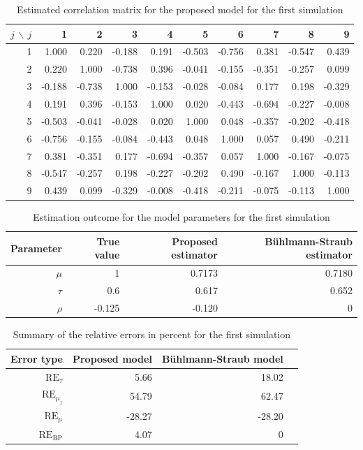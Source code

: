 \documentclass[11pt]{article}
\theoremstyle{definition}
\begin{document}
\begin{table}[H]
\label{tab:1_sim_corr}
\centering
\caption{Estimated correlation matrix for the proposed model for the first simulation}
\begin{tabular}{r|rrrrrrrrr}
  \hline
 $j\,\backslash\, j$ & 1 & 2 & 3 & 4 & 5 & 6 & 7 & 8 & 9 \\ 
  \hline
1 & 1.000 & 0.220 & -0.188 & 0.191 & -0.503 & -0.756 & 0.381 & -0.547 & 0.439 \\ 
  2 & 0.220 & 1.000 & -0.738 & 0.396 & -0.041 & -0.155 & -0.351 & -0.257 & 0.099 \\ 
  3 & -0.188 & -0.738 & 1.000 & -0.153 & -0.028 & -0.084 & 0.177 & 0.198 & -0.329 \\ 
  4 & 0.191 & 0.396 & -0.153 & 1.000 & 0.020 & -0.443 & -0.694 & -0.227 & -0.008 \\ 
  5 & -0.503 & -0.041 & -0.028 & 0.020 & 1.000 & 0.048 & -0.357 & -0.202 & -0.418 \\ 
  6 & -0.756 & -0.155 & -0.084 & -0.443 & 0.048 & 1.000 & 0.057 & 0.490 & -0.211 \\ 
  7 & 0.381 & -0.351 & 0.177 & -0.694 & -0.357 & 0.057 & 1.000 & -0.167 & -0.075 \\ 
  8 & -0.547 & -0.257 & 0.198 & -0.227 & -0.202 & 0.490 & -0.167 & 1.000 & -0.113 \\ 
  9 & 0.439 & 0.099 & -0.329 & -0.008 & -0.418 & -0.211 & -0.075 & -0.113 & 1.000 \\ 
   \hline
\end{tabular}
\end{table}

\begin{table}[H]
\label{tab:1_sim_single_params}
    \centering
        \caption{Estimation outcome for the model parameters for the first simulation}
    \begin{tabular}{rrrr}
    \hline
    Parameter & True value & Proposed estimator & Bühlmann-Straub estimator \\
    \hline
    $\mu$ & 1 & 0.7173 & 0.7180 \\
    $\tau$ & 0.6 & 0.617 & 0.652 \\
    $\rho$ & -0.125 & -0.120 & 0 \\    
    \hline
    \end{tabular}
\end{table}

\begin{table}[H]
\label{tab:1_sim_errors}
    \centering
        \caption{Summary of the relative errors in percent for the first simulation}
    \begin{tabular}{rrrr}
    \hline
    Error type & Proposed model & Bühlmann-Straub model \\
    \hline
    $\text{RE}_\tau$ & 5.66      & 18.02\\
    $\text{RE}_{\mu_j}$ & 54.79  & 62.47 \\
    $\text{RE}_\mu$ &  -28.27    & -28.20 \\
    $\text{RE}_\text{BP}$ & 4.07 & 0 \\  
    \hline
    \end{tabular}
\end{table}
\end{document}
